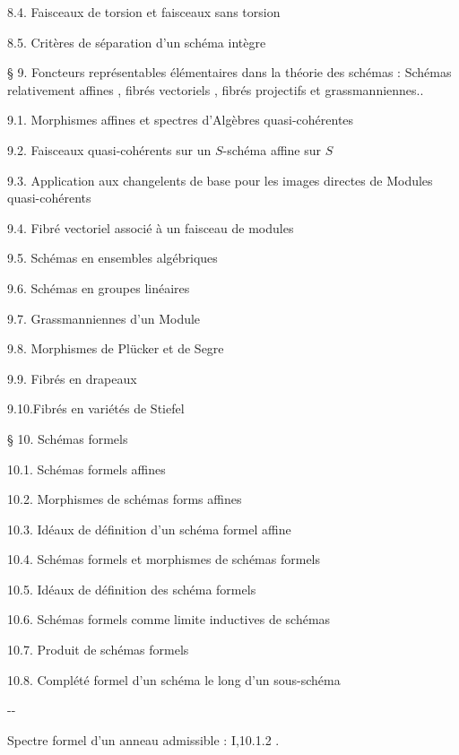 8.4. Faisceaux de torsion et faisceaux sans torsion\dotfill

8.5. Critères de séparation d'un schéma intègre\dotfill

\noindent § 9. Foncteurs représentables élémentaires dans la théorie des schémas : Schémas relativement affines , fibrés vectoriels , fibrés projectifs et grassmanniennes..

9.1. Morphismes affines et spectres d'Algèbres quasi-cohérentes\dotfill

9.2. Faisceaux quasi-cohérents sur un $S$-schéma affine sur $S$\dotfill

9.3. Application aux changelents de base pour les images directes de Modules quasi-cohérents\dotfill

9.4. Fibré vectoriel associé à un faisceau de modules\dotfill

9.5. Schémas en ensembles algébriques\dotfill

9.6. Schémas en groupes linéaires\dotfill

9.7. Grassmanniennes d'un Module\dotfill

9.8. Morphismes de Plücker et de Segre\dotfill

9.9. Fibrés en drapeaux\dotfill

9.10.Fibrés en variétés de Stiefel\dotfill

\noindent § 10. Schémas formels\dotfill

10.1. Schémas formels affines\dotfill

10.2. Morphismes de schémas forms affines\dotfill

10.3. Idéaux de définition d'un schéma formel affine\dotfill

10.4. Schémas formels et morphismes de schémas formels\dotfill

10.5. Idéaux de définition des schéma formels\dotfill

10.6. Schémas formels comme limite inductives de schémas

10.7. Produit de schémas formels\dotfill

10.8. Complété formel d'un schéma le long d'un sous-schéma\dotfill

\begin{center}-\qquad -\end{center}

Spectre formel d'un anneau admissible : I,10.1.2 .

